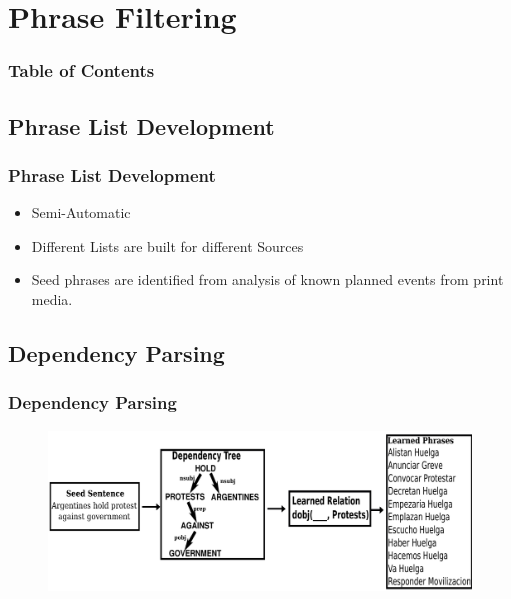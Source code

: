 \documentclass[red]{beamer}
\begin{document}
\section{Phrase Filtering}
\begin{frame}
\frametitle{Table of Contents}
\tableofcontents[currentsection]
\end{frame}

\subsection{Phrase List Development}
\begin{frame}
\frametitle{Phrase List Development}
    \begin{itemize}
        \item
            Semi-Automatic
        \item
            Different Lists are built for different Sources
        \item
            Seed phrases are identified from analysis of known planned events from print media.
    \end{itemize}

\end{frame}

\subsection{Dependency Parsing}
\begin{frame}
    \frametitle{Dependency Parsing}
    \begin{figure}
        \includegraphics[width=\textwidth]{phraseLearning}
    \end{figure}
\end{frame}
\end{document}
